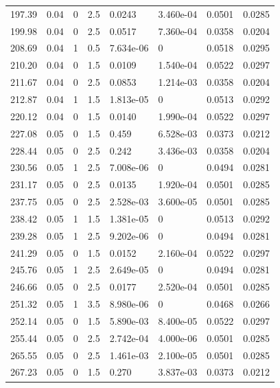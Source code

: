 \documentclass[preview]{standalone}
\begin{document}
{{{\begin{tabular}{L{1.2cm}C{1.2cm} C{0.3cm}C{0.5cm} C{1.4cm}C{1.4cm} C{1.4cm}C{1.4cm}}
  197.39  &  0.04  & 0     & 2.5 &  0.0243  & 3.460e-04  & 0.0501 &  0.0285   \\ 
  199.98  &  0.04  & 0     & 2.5 &  0.0517  & 7.360e-04  & 0.0358 &  0.0204   \\ 
  208.69  &  0.04  & 1     & 0.5 &  7.634e-06  & 0  & 0.0518 &  0.0295   \\ 
  210.20  &  0.04  & 0     & 1.5 &  0.0109  & 1.540e-04  & 0.0522 &  0.0297   \\ 
  211.67  &  0.04  & 0     & 2.5 &  0.0853  & 1.214e-03  & 0.0358 &  0.0204   \\ 
  212.87  &  0.04  & 1     & 1.5 &  1.813e-05  & 0  & 0.0513 &  0.0292   \\ 
  220.12  &  0.04  & 0     & 1.5 &  0.0140  & 1.990e-04  & 0.0522 &  0.0297   \\ 
  227.08  &  0.05  & 0     & 1.5 &  0.459  & 6.528e-03  & 0.0373 &  0.0212   \\ 
  228.44  &  0.05  & 0     & 2.5 &  0.242  & 3.436e-03  & 0.0358 &  0.0204   \\ 
  230.56  &  0.05  & 1     & 2.5 &  7.008e-06  & 0  & 0.0494 &  0.0281   \\ 
  231.17  &  0.05  & 0     & 2.5 &  0.0135  & 1.920e-04  & 0.0501 &  0.0285   \\ 
  237.75  &  0.05  & 0     & 2.5 &  2.528e-03  & 3.600e-05  & 0.0501 &  0.0285   \\ 
  238.42  &  0.05  & 1     & 1.5 &  1.381e-05  & 0  & 0.0513 &  0.0292   \\ 
  239.28  &  0.05  & 1     & 2.5 &  9.202e-06  & 0  & 0.0494 &  0.0281   \\ 
  241.29  &  0.05  & 0     & 1.5 &  0.0152  & 2.160e-04  & 0.0522 &  0.0297   \\ 
  245.76  &  0.05  & 1     & 2.5 &  2.649e-05  & 0  & 0.0494 &  0.0281   \\ 
  246.66  &  0.05  & 0     & 2.5 &  0.0177  & 2.520e-04  & 0.0501 &  0.0285   \\ 
  251.32  &  0.05  & 1     & 3.5 &  8.980e-06  & 0  & 0.0468 &  0.0266   \\ 
  252.14  &  0.05  & 0     & 1.5 &  5.890e-03  & 8.400e-05  & 0.0522 &  0.0297   \\ 
  255.44  &  0.05  & 0     & 2.5 &  2.742e-04  & 4.000e-06  & 0.0501 &  0.0285   \\ 
  265.55  &  0.05  & 0     & 2.5 &  1.461e-03  & 2.100e-05  & 0.0501 &  0.0285   \\ 
  267.23  &  0.05  & 0     & 1.5 &  0.270  & 3.837e-03  & 0.0373 &  0.0212   \\ 

\end{tabular}}}}
\end{document}
